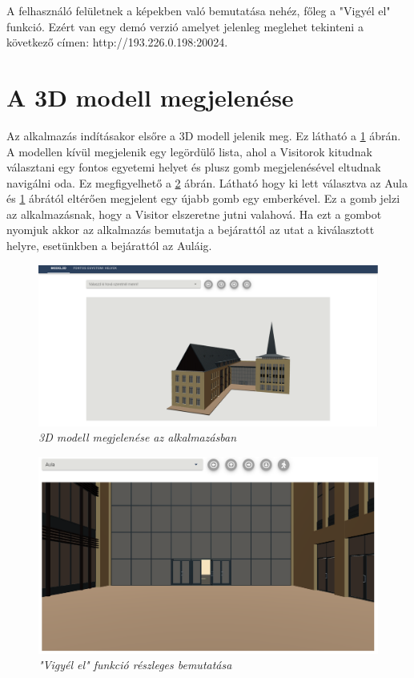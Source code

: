 A felhasználó felületnek a képekben való bemutatása nehéz, főleg a "Vigyél el" funkció. Ezért van egy demó verzió amelyet jelenleg meglehet tekinteni a következő címen: http://193.226.0.198:20024. 

\section{A 3D modell megjelenése}

Az alkalmazás indításakor elsőre a 3D modell jelenik meg. Ez látható a \ref{fig:modell3D} ábrán. A modellen kívül megjelenik egy legördülő lista, ahol a Visitorok kitudnak választani egy fontos egyetemi helyet és plusz gomb megjelenésével eltudnak navigálni oda. Ez megfigyelhető a \ref{fig:takeMe} ábrán. Látható hogy ki lett választva az Aula és \ref{fig:modell3D} ábrától eltérően megjelent egy újabb gomb egy emberkével. Ez a gomb jelzi az alkalmazásnak, hogy a Visitor elszeretne jutni valahová. Ha ezt a gombot nyomjuk akkor az alkalmazás bemutatja a bejárattól az utat a kiválasztott helyre, esetünkben a bejárattól az Auláig.
\begin{figure}[H]
	\centering
	\includegraphics[width=0.9\linewidth]{figures/images/3dmodell.png}
	\caption[3D modell megjelenése az alkalmazásban]{\textit{3D modell megjelenése az alkalmazásban}}
	\label{fig:modell3D}
\end{figure} 

\begin{figure}[H]
	\centering
	\includegraphics[width=0.9\linewidth]{figures/images/vigyelEl.png}
	\caption["Vigyél el" funkció részleges bemutatása]{\textit{"Vigyél el" funkció részleges bemutatása}}
	\label{fig:takeMe}
\end{figure} 

